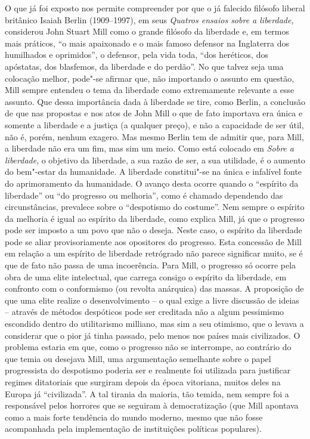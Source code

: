O que já foi exposto nos permite compreender por que o já falecido
filósofo liberal britânico Isaiah Berlin (1909--1997), 
em seus \textit{Quatros ensaios sobre a liberdade}, considerou John
Stuart Mill como o grande filósofo da liberdade e, em termos mais
práticos, ``o mais apaixonado e o mais famoso defensor na
Inglaterra dos humilhados e oprimidos'', o defensor, pela vida toda,
``dos heréticos, dos apóstatas, dos blasfemos, da liberdade e do
perdão''. No que talvez seja uma colocação melhor, pode"-se afirmar
que, não importando o assunto em questão, Mill sempre entendeu o tema
da liberdade como extremamente relevante a esse assunto. Que dessa
importância dada à liberdade se tire, como Berlin, a conclusão de que
nas propostas e nos atos de John Mill o que de fato importava era única
e somente a liberdade e a justiça (a qualquer preço), e não a
capacidade de ser útil, não é, porém, nenhum exagero. Mas mesmo Berlin
tem de admitir que, para Mill, a liberdade não era um fim, mas sim um
meio. Como está colocado em \textit{Sobre a liberdade}, o objetivo da
\mbox{liberdade}, a sua razão de ser, a sua utilidade, é o aumento do
bem"-estar da humanidade. A liberdade constitui"-se na única e
infalível fonte do aprimoramento da humanidade. O avanço desta ocorre
quando o ``espírito da liberdade'' ou ``do progresso ou melhoria'', como é
chamado dependendo das circunstâncias, prevalece sobre o ``despotismo do
costume''. Nem sempre o espírito da melhoria é igual ao espírito da
liberdade, como explica Mill, já que o progresso pode ser imposto a um
povo que não o deseja. Neste caso, o espírito da liberdade pode se
aliar provisoriamente aos opositores do progresso. Esta concessão de
Mill em relação a um espírito de liberdade retrógrado não parece
significar muito, se é que de fato não passa de uma incoerência. Para
Mill, o progresso só ocorre pela obra de uma elite intelectual, que
carrega consigo o espírito da liberdade, em confronto com o conformismo
(ou revolta anárquica) das massas. A proposição de que uma elite
realize o desenvolvimento – o qual exige a livre discussão de ideias –
através de métodos despóticos pode ser creditada não a algum pessimismo
escondido dentro do utilitarismo milliano, mas sim a seu otimismo, que
o levava a considerar que o pior já tinha passado, pelo menos nos
países mais civilizados. O problema estaria em que, como o progresso
não se interrompe, ao contrário do que temia ou desejava Mill, uma
argumentação semelhante sobre o papel progressista do despotismo
poderia ser e realmente foi utilizada para justificar regimes
ditatoriais que surgiram depois da época vitoriana, muitos deles na
Europa já ``civilizada''. A tal tirania da maioria, tão temida, nem
sempre foi a responsável pelos horrores que se seguiram à
democratização (que Mill apontava como a mais forte tendência do mundo
moderno, mesmo que não fosse acompanhada pela implementação de
instituições políticas populares). 

